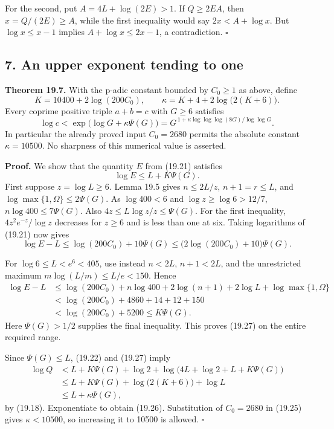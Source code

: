 \documentclass[
  11pt,
  a4paper,
]{article}
\begin{document}
For the second, put \(A=4L+\log(2E)>1\). If \(Q\ge2EA\), then
\(x=Q/(2E)\ge A\), while the first inequality would say \(2x<A+\log x\).
But \(\log x\le x-1\) implies \(A+\log x\le2x-1\), a contradiction.
\(\square\)

\subsection{7. An upper exponent tending to
one}\label{an-upper-exponent-tending-to-one}

\textbf{Theorem 19.7.} With the p-adic constant bounded by \(C_0\ge1\)
as above, define \[
 K=10400+2\log(200C_0),\qquad
 \kappa=K+4+2\log\bigl(2(K+6)\bigr).
 \tag{19.25}
\] Every coprime positive triple \(a+b=c\) with \(G\ge6\) satisfies \[
 \log c<\exp\bigl(\log G+\kappa\Psi(G)\bigr)
 =G^{\,1+\kappa\log\log\log(8G)/\log\log G}.
 \tag{19.26}
\] In particular the already proved input \(C_0=2680\) permits the
absolute constant \(\kappa=10500\). No sharpness of this numerical value
is asserted.

\textbf{Proof.} We show that the quantity \(E\) from (19.21) satisfies
\[
 \log E\le L+K\Psi(G).
 \tag{19.27}
\] First suppose \(z=\log L\ge6\). Lemma 19.5 gives \(n\le2L/z\),
\(n+1=r\le L\), and \(\log\max\{1,\Omega\}\le2\Psi(G)\). As
\(\log400<6\) and \(\log z\ge\log6>12/7\), \(n\log400\le7\Psi(G)\). Also
\(4z\le L\log z/z\le\Psi(G)\). For the first inequality,
\(4z^2e^{-z}/\log z\) decreases for \(z\ge6\) and is less than one at
six. Taking logarithms of (19.21) now gives \[
 \log E-L\le\log(200C_0)+10\Psi(G)
             \le\bigl(2\log(200C_0)+10\bigr)\Psi(G).
\]

For \(\log6\le L<e^6<405\), use instead \(n<2L\), \(n+1<2L\), and the
unrestricted maximum \(m\log(L/m)\le L/e<150\). Hence \[
 \begin{aligned}
 \log E-L
 &\le\log(200C_0)+n\log400+2\log(n+1)
                       +2\log L+\log\max\{1,\Omega\}\\
 &<\log(200C_0)+4860+14+12+150\\
 &<\log(200C_0)+5200\le K\Psi(G).
 \end{aligned}
\] Here \(\Psi(G)>1/2\) supplies the final inequality. This proves
(19.27) on the entire required range.

Since \(\Psi(G)\le L\), (19.22) and (19.27) imply \[
 \begin{aligned}
 \log Q
 &<L+K\Psi(G)+\log2
       +\log\bigl(4L+\log2+L+K\Psi(G)\bigr)\\
 &\le L+K\Psi(G)+\log\bigl(2(K+6)\bigr)+\log L\\
 &\le L+\kappa\Psi(G),
 \end{aligned}
\] by (19.18). Exponentiate to obtain (19.26). Substitution of
\(C_0=2680\) in (19.25) gives \(\kappa<10500\), so increasing it to
10500 is allowed. \(\square\)
\end{document}
